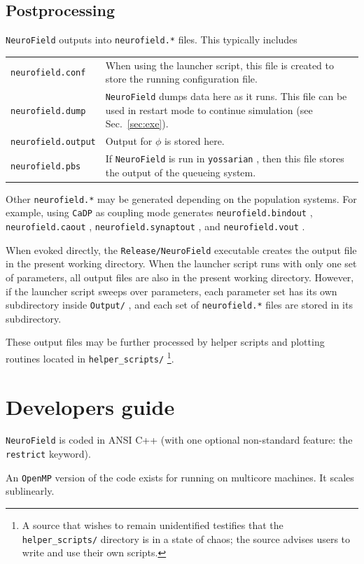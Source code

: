 \documentclass[12pt,a4paper]{article}
\newcommand{\type}[1]{ {\small\small\tt #1} }
\begin{document}
\subsection{Postprocessing}

\type{NeuroField} outputs into \type{neurofield.*} files. This typically includes

\begin{tabular}{l p{11.5cm}}
\type{neurofield.conf}& When using the launcher script, this file is created to store the running configuration file.\\
\type{neurofield.dump}& \type{NeuroField} dumps data here as it runs. This file can be used in restart mode to continue simulation (see Sec.~\ref{sec:exe}).\\
\type{neurofield.output}& Output for $\phi$ is stored here.\\
\type{neurofield.pbs}& If \type{NeuroField} is run in \type{yossarian}, then this file stores the output of the queueing system.
\end{tabular}
Other \type{neurofield.*} may be generated depending on the population systems. For example, using \type{CaDP} as coupling mode generates \type{neurofield.bindout},\type{neurofield.caout},\type{neurofield.synaptout}, and \type{neurofield.vout}.

When evoked directly, the \type{Release/NeuroField} executable creates the output file in the present working directory. When the launcher script runs with only one set of parameters, all output files are also in the present working directory. However, if the launcher script sweeps over parameters, each parameter set has its own subdirectory inside \type{Output/}, and each set of \type{neurofield.*} files are stored in its subdirectory.

These output files may be further processed by helper scripts and plotting routines located in \type{helper\_scripts/}\footnote{A source that wishes to remain unidentified testifies that the \type{helper\_scripts/} directory is in a state of chaos; the source advises users to write and use their own scripts.}.

\pagebreak
\section{Developers guide}

\type{NeuroField} is coded in ANSI C++ (with one optional non-standard feature: the \type{restrict} keyword).

An \type{OpenMP} version of the code exists for running on multicore machines. It scales sublinearly.
\end{document}
